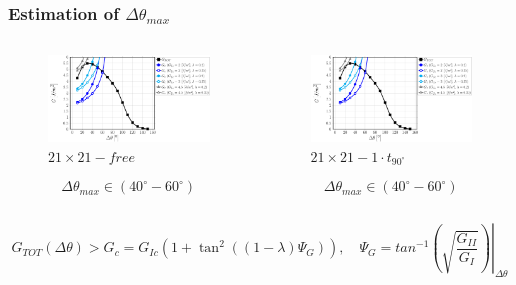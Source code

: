 \documentclass[first,firstsupp,lastsupp,last,hyperref,table]{ETHclass}
\begin{document}
\begin{frame}
\frametitle{\vspace{0.2cm}\small Estimation of $\Delta\theta_{max}$}
\vspace{-1.25cm}
\centering
\begin{columns}[c]
\centering
\begin{column}{0.5\textwidth}
\centering
\begin{figure}
\centering
\caption{\scriptsize $21\times 21-free$}
\includegraphics[width=\columnwidth]{vf60-dsize-S10A10.pdf}
\end{figure}
\scriptsize
\begin{equation*}
\Delta\theta_{max}\in\left(40^{\circ}-60^{\circ}\right)
\end{equation*}
\end{column}
\begin{column}{0.5\textwidth}
\centering
\begin{figure}
\centering
\caption{\scriptsize$21\times 21-1\cdot t_{90^{\circ}}$}
\includegraphics[width=\columnwidth]{vf60-dsize-S10A10T1.pdf}
\end{figure}
\scriptsize
\begin{equation*}
\Delta\theta_{max}\in\left(40^{\circ}-60^{\circ}\right)
\end{equation*}
\end{column}
\end{columns}
\scriptsize
\vspace{0.25cm}
\begin{equation*}
G_{TOT}\left(\Delta\theta\right)>G_{c}=G_{Ic}\left(1+\tan^{2}\left(\left(1-\lambda\right)\Psi_{G}\right)\right),\quad\Psi_{G}=\left.tan^{-1}\left(\sqrt{\frac{G_{II}}{G_{I}}}\right)\right|_{\Delta\theta}
\end{equation*}
\end{frame}
\end{document}
